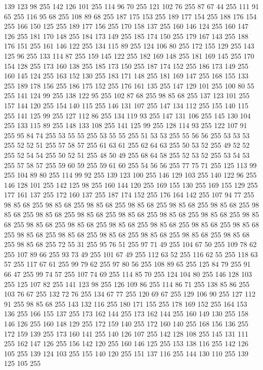 139 123 98 255 142 126 101 255 114 96 70 255 121 102 76 255 87 67 44 255 111 91 65 255 116 95 68 255 108 89 68 255 187 175 153 255 189 177 154 255 188 176 154 255 166 150 125 255 189 177 156 255 170 158 137 255 160 146 124 255 160 147 126 255 181 170 148 255 184 173 149 255 185 174 150 255 179 167 143 255 188 176 151 255 161 146 122 255 134 115 89 255 124 106 80 255 172 155 129 255 143 125 96 255 133 114 87 255 159 145 122 255 182 169 148 255 181 169 145 255 170 154 128 255 173 160 138 255 185 173 150 255 187 174 152 255 186 173 149 255 160 145 124 255 163 152 130 255 183 171 148 255 181 169 147 255 168 155 133 255 189 178 156 255 186 175 152 255 176 161 135 255 147 129 101 255 100 80 55 255 141 124 99 255 138 122 95 255 102 87 68 255 98 85 68 255 137 123 101 255 157 144 120 255 154 140 115 255 146 131 107 255 147 134 112 255 155 140 115 255 141 125 99 255 127 112 86 255 134 119 93 255 147 131 106 255 145 130 104 255 133 115 89 255 148 133 108 255 141 125 99 255 128 114 93 255
122 107 91 255 95 84 74 255 53 55 55 255 53 55 55 255 51 53 53 255 55 56 56 255 53 53 53 255 52 52 51 255 57 58 57 255 61 63 61 255 62 64 63 255 50 53 52 255 49 52 52 255 52 54 54 255 50 52 51 255 48 50 49 255 68 64 58 255 52 53 52 255 53 54 53 255 57 58 57 255 59 60 59 255 59 61 60 255 54 56 56 255 77 75 71 255 125 113 99 255 104 89 80 255 114 99 92 255 139 123 100 255 146 129 103 255 140 122 96 255 146 128 101 255 142 125 98 255 160 144 120 255 169 155 130 255 169 155 129 255 177 161 137 255 172 160 137 255 187 174 152 255 176 164 142 255 107 94 77 255 98 85 68 255 98 85 68 255 98 85 68 255 98 85 68 255 98 85 68 255 98 85 68 255 98 85 68 255 98 85 68 255 98 85 68 255 98 85 68 255 98 85 68 255 98 85 68 255 98 85 68 255 98 85 68 255 98 85 68 255 98 85 68 255 98 85 68 255 98 85 68 255 98 85 68 255 98 85 68 255 98 85 68 255 98 85 68 255 98 85 68 255 98 85 68 255
98 85 68 255 98 85 68 255 72 55 31 255 95 76 51 255 97 71 49 255 104 67 50 255 109 78 62 255 107 89 66 255 93 73 49 255 101 67 49 255 112 63 52 255 116 62 55 255 118 63 57 255 117 67 61 255 99 79 62 255 97 80 56 255 108 89 65 255 125 84 79 255 91 66 47 255 99 74 57 255 107 74 69 255 114 85 70 255 124 104 80 255 146 128 103 255 125 107 82 255 141 123 98 255 126 109 86 255 114 86 71 255 138 85 86 255 103 76 67 255 132 72 76 255 134 67 77 255 120 69 67 255 129 106 90 255 127 112 91 255 98 85 68 255 143 132 116 255 180 171 155 255 178 169 152 255 164 153 136 255 166 155 137 255 173 162 144 255 173 162 144 255 160 149 130 255 158 146 126 255 160 148 129 255 172 159 140 255 172 160 140 255 168 156 136 255 172 159 139 255 173 160 141 255 140 126 107 255 142 128 108 255 145 131 111 255 162 147 126 255 156 142 120 255 160 146 125 255 153 138 116 255 142 126 105 255 139 124 103 255 155 140 120 255 151 137 116 255 144 130 110 255 139 125 105 255
